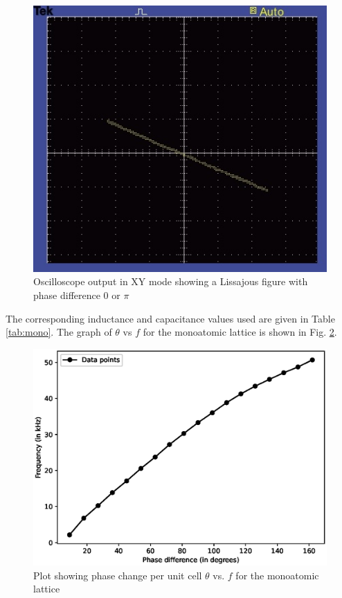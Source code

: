 \begin{figure}[H]
    \centering
    \includegraphics[width=.8\columnwidth]{images/TEK0001.JPG}
    \caption{Oscilloscope output in XY mode showing a Lissajous figure with phase difference 0 or $\pi$}
    \label{tk2}
\end{figure}

The corresponding inductance and capacitance values used are given in Table \ref{tab:mono}. The graph of $\theta$ vs $f$ for the monoatomic lattice is shown in Fig. \ref{g1}.



\begin{figure}
    \centering
    \includegraphics[width=1\columnwidth]{images/mono.eps}
    \caption{Plot showing phase change per unit cell $\theta$ vs. $f$ for the monoatomic lattice}
    \label{g1}
\end{figure}

